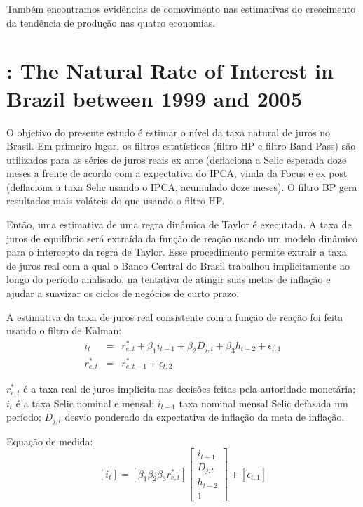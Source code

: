 \documentclass[11pt,oneside,a4paper]{article}
\begin{document}
Também encontramos evidências de comovimento nas estimativas do crescimento da tendência de produção nas quatro economias.
%
%
\section{\citet{Portugal:2009}: The Natural Rate of Interest in Brazil between 1999 and 2005}
O objetivo do presente estudo é estimar o nível da taxa natural de juros no Brasil. Em primeiro lugar, os filtros estatísticos (filtro HP e filtro Band-Pass) são utilizados para as séries de juros reais ex ante (deflaciona a Selic esperada doze meses a frente de acordo com a expectativa do IPCA, vinda da Focus  e ex post (deflaciona a taxa Selic usando o IPCA, acumulado doze meses). O filtro BP gera resultados mais voláteis do que usando o filtro HP.

Então, uma estimativa de uma regra dinâmica de Taylor é executada. A taxa de juros de equilíbrio será extraída da função de reação usando um modelo dinâmico para o intercepto da regra de Taylor. Esse procedimento permite extrair a taxa de juros real com a qual o Banco Central do Brasil trabalhou implicitamente ao longo do período analisado, na tentativa de atingir suas metas de inflação e ajudar a suavizar os ciclos de negócios de curto prazo.

A estimativa da taxa de juros real consistente com a função de reação foi feita usando o filtro de Kalman:
\begin{eqnarray}
    i_t &=& r_{e,t}^{*} + \beta_{1} i_{t-1} + \beta_{2}D_{j,t} + \beta_{3}h_{t-2} + \epsilon_{t,1} \\
    r_{e,t}^{*} &=& r_{e,t-1}^{*} + \epsilon_{t,2}
\end{eqnarray}

$r_{e,t}^{*} $ é a taxa real de juros implícita nas decisões feitas pela autoridade monetária; $i_t$ é a taxa Selic nominal e mensal; $i_{t-1}$ taxa nominal mensal Selic defasada um período; $D_{j,t}$ desvio ponderado da expectativa de inflação da meta de inflação.

Equação de medida:
$$ [i_t] = [ \beta_1  \beta_2  \beta_3  r_{e,t}^{*} ] \left[ \begin{array}{}
    i_{t-1} \\
    D_{j,t} \\
    h_{t-2} \\
    1
\end{array} \right] + [\epsilon_{t,1} ]$$
\end{document}
